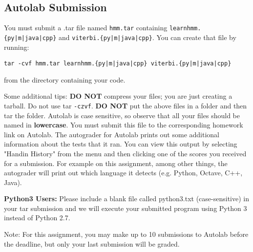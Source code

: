 \documentclass{article}
\begin{document}
\subsection{Autolab Submission}

You must submit a .tar file named {\tt hmm.tar} containing \texttt{learnhmm.\{py|m|java|cpp\}} and \texttt{viterbi.\{py|m|java|cpp\}}.
You can create that file by running:
\begin{lstlisting}
tar -cvf hmm.tar learnhmm.{py|m|java|cpp} viterbi.{py|m|java|cpp}
\end{lstlisting}
from the directory containing your code.

Some additional tips: {\bf DO NOT} compress your files; you are just
creating a tarball. Do not use tar \texttt{-czvf}.  {\bf DO NOT} put
the above files in a folder and then tar the folder.  Autolab is case
sensitive, so observe that all your files should be named in {\bf
  lowercase}. You must submit this file to the corresponding homework
link on Autolab. The autograder for Autolab prints out some additional 
information about the tests that it ran. You can view this output by selecting 
 "Handin History" from the menu and then clicking one of the scores you 
 received for a submission. For example on this assignment, among other things, 
 the autograder will print out which language it detects (e.g. Python, Octave, C++, Java). 
 
 \begin{notebox}
  {\bf Python3 Users:} Please include a blank file called python3.txt (case-sensitive) in your tar submission and we will execute your submitted program using Python 3 instead of Python 2.7.
 \end{notebox}

Note: For this assignment, you may make up to 10 submissions to Autolab before the deadline, but only your last submission will be graded.
   
\end{document}

